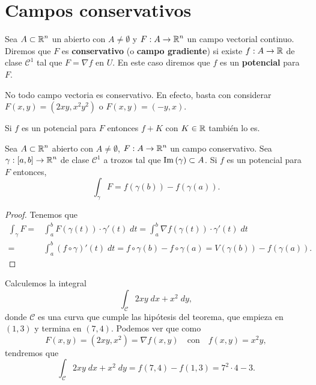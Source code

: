 \section{Campos conservativos}
\begin{definition}
Sea $\displaystyle A \subset \mathbb{R}^{n} $ un abierto con $\displaystyle A \neq \emptyset $ y $\displaystyle F : A \to \mathbb{R}^{n} $ un campo vectorial continuo. Diremos que $\displaystyle F $ es \textbf{conservativo} (o \textbf{campo gradiente}) si existe $\displaystyle f : A \to \mathbb{R} $ de clase $\displaystyle \mathcal{C}^{1} $ tal que $\displaystyle F = \nabla f $ en $\displaystyle U $. En este caso diremos que $\displaystyle f $ es un \textbf{potencial} para $\displaystyle F $. 
\end{definition}
\begin{eg}
No todo campo vectoria es conservativo. En efecto, basta con considerar $\displaystyle F\left(x,y\right)=\left(2xy, x^{2}y^{2}\right) $ o $\displaystyle F\left(x,y\right)=\left(-y,x\right) $. 
\end{eg}

\begin{observation}
Si $\displaystyle f $ es un potencial para $\displaystyle F $ entonces $\displaystyle f + K $ con $\displaystyle K \in \mathbb{R} $ también lo es.
\end{observation}
\begin{prop}
	Sea $\displaystyle A \subset \mathbb{R}^{n} $ abierto con $\displaystyle A \neq \emptyset $, $\displaystyle F : A \to \mathbb{R}^{n} $ un campo conservativo. Sea $\displaystyle \gamma : \left[a,b\right] \to \mathbb{R}^{n} $ de clase $\displaystyle \mathcal{C}^{1} $ a trozos tal que $\displaystyle \operatorname{Im}\left(\gamma \right)\subset A $. Si $\displaystyle f $ es un potencial para $\displaystyle F $ entonces, 
	\[\int _{\gamma }F =f\left(\gamma\left(b\right)\right)-f\left(\gamma\left(a\right)\right) .\]
\end{prop}
\begin{proof}
Tenemos que 
\[
\begin{split}
	\int _{\gamma }F = & \int^{b}_{a} F\left(\gamma\left(t\right)\right) \cdot \gamma'\left(t\right) \; dt = \int^{b}_{a} \nabla f\left(\gamma\left(t\right)\right) \cdot \gamma'\left(t\right) \; dt \\
	= &  \int^{b}_{a} \left(f\circ \gamma \right)'\left(t\right) \; dt = f\circ \gamma \left(b\right)-f\circ \gamma \left(a\right)=V\left(\gamma\left(b\right)\right)-f\left(\gamma\left(a\right)\right).
\end{split}
\]
\end{proof}
\begin{eg}
Calculemos la integral
\[\int _{\mathcal{C}}2xy \; dx + x^{2} \; dy ,\]
donde $\displaystyle \mathcal{C} $ es una curva que cumple las hipótesis del teorema, que empieza en $\displaystyle \left(1,3\right) $ y termina en $\displaystyle \left(7,4\right) $. Podemos ver que como 
\[F\left(x,y\right)=\left(2xy, x^{2}\right)=\nabla f\left(x,y\right) \quad \text{con}\quad f\left(x,y\right)=x^{2}y ,\]
tendremos que 
\[\int _{\mathcal{C}}2xy \; dx + x^{2}\; dy = f\left(7,4\right)-f\left(1,3\right)=7^{2} \cdot 4 - 3 .\]
\end{eg}

